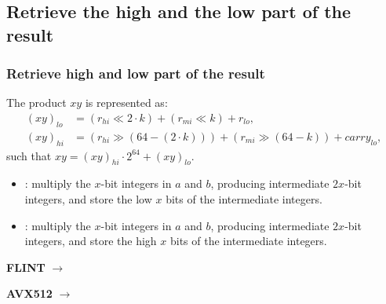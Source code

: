 \documentclass[10pt]{beamer}
\begin{document}
\subsection{Retrieve the high and the low part of the result}
\begin{frame}
    \frametitle{Retrieve high and low part of the result}
    \begin{mybox}
        The product $xy$ is represented as:
        \begin{align*}
            (xy)_{lo} &= (r_{hi} \ll 2\cdot k) + (r_{mi} \ll k) + r_{lo}, \\
            (xy)_{hi} &= (r_{hi} \gg (64 - (2\cdot k))) + (r_{mi} \gg (64 - k)) + carry_{lo},
        \end{align*}
        such that $xy = (xy)_{hi}\cdot 2^{64} + (xy)_{lo}$.
    \end{mybox}

    \begin{itemize}
        \item {}: multiply the $x$-bit integers in $a$ and $b$, producing intermediate $2x$-bit integers, 
        and store the low $x$ bits of the intermediate integers.
        \item {}: multiply the $x$-bit integers in $a$ and $b$, producing intermediate $2x$-bit integers, 
        and store the high $x$ bits of the intermediate integers.
    \end{itemize}

    \medskip
    \textbf{FLINT} $\longrightarrow$ 

    \medskip
    \textbf{AVX512} $\longrightarrow$ 

    \begin{table}[h!]
        \centering
    \end{table}
\end{frame}
\end{document}

